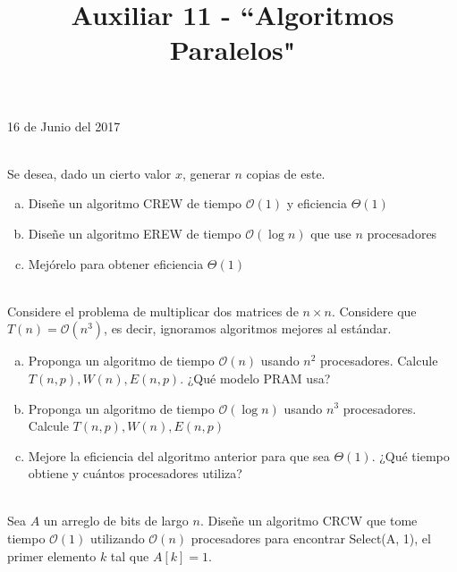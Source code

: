 \documentclass[dcc,uchile]{fcfmcourse}
\title{Auxiliar 11 - ``Algoritmos Paralelos"}
\begin{document}
\maketitle
\begin{center}
16 de Junio del 2017
\end{center}
\vspace{-1ex}


\begin{problems}
\\
Se desea, dado un cierto valor $x$, generar $n$ copias de este.
\begin{enumerate}[a)]
    \item Diseñe un algoritmo CREW de tiempo $\mathcal{O}(1)$ y eficiencia $\Theta(1)$
    \item Diseñe un algoritmo EREW de tiempo $\mathcal{O}(\log n)$ que use $n$ procesadores
    \item Mejórelo para obtener eficiencia $\Theta(1)$
\end{enumerate}

\\
Considere el problema de multiplicar dos matrices de $n\times n$. Considere que $T(n) = \mathcal{O}(n^3)$, es decir, ignoramos algoritmos mejores al estándar.
\begin{enumerate}[a)]
    \item Proponga un algoritmo de tiempo $\mathcal{O}(n)$ usando $n^2$ procesadores. Calcule $T(n, p), W(n), E(n, p)$. ¿Qué modelo PRAM usa?
    \item Proponga un algoritmo de tiempo $\mathcal{O}(\log n)$ usando $n^3$ procesadores. Calcule $T(n, p), W(n), E(n, p)$
    \item Mejore la eficiencia del algoritmo anterior para que sea $\Theta(1)$. ¿Qué tiempo obtiene y cuántos procesadores utiliza?
\end{enumerate}
\\
Sea $A$ un arreglo de bits de largo $n$. Diseñe un algoritmo CRCW que tome tiempo $\mathcal{O}(1)$ utilizando $\mathcal{O}(n)$ procesadores para encontrar Select(A, 1), el primer elemento $k$ tal que $A[k] = 1$.
\end{problems}
\end{document}
